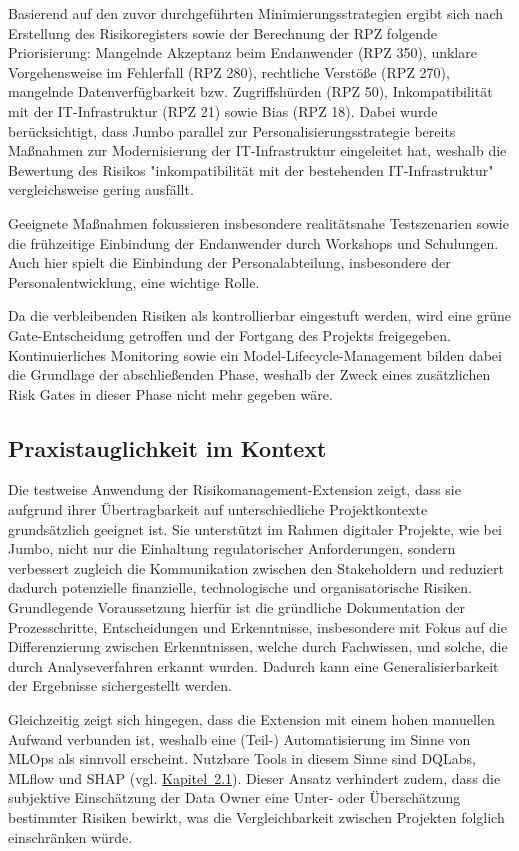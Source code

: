 Basierend auf den zuvor durchgeführten Minimierungsstrategien ergibt sich nach Erstellung des Risikoregisters sowie der Berechnung der RPZ folgende Priorisierung: 
Mangelnde Akzeptanz beim Endanwender (RPZ 350), unklare Vorgehensweise im Fehlerfall (RPZ 280), rechtliche Verstöße (RPZ 270), mangelnde Datenverfügbarkeit bzw. Zugriffshürden (RPZ 50), Inkompatibilität mit der IT-Infrastruktur (RPZ 21) sowie Bias (RPZ 18). 
Dabei wurde berücksichtigt, dass Jumbo parallel zur Personalisierungsstrategie bereits Maßnahmen zur Modernisierung der IT-Infrastruktur eingeleitet hat, weshalb die Bewertung des Risikos "inkompatibilität mit der bestehenden IT-Infrastruktur" vergleichsweise gering ausfällt.

Geeignete Maßnahmen fokussieren insbesondere realitätsnahe Testszenarien sowie die frühzeitige Einbindung der Endanwender durch Workshops und Schulungen. Auch hier spielt die Einbindung der Personalabteilung, insbesondere der Personalentwicklung, eine wichtige Rolle.

Da die verbleibenden Risiken als kontrollierbar eingestuft werden, 
wird eine grüne Gate-Entscheidung getroffen und der Fortgang des Projekts freigegeben. 
Kontinuierliches Monitoring sowie ein Model-Lifecycle-Management bilden dabei die Grundlage der abschließenden Phase, weshalb der Zweck eines zusätzlichen Risk Gates in dieser Phase nicht mehr gegeben wäre.

\subsection{Praxistauglichkeit im Kontext}
Die testweise Anwendung der Risikomanagement-Extension zeigt, dass sie aufgrund ihrer Übertragbarkeit auf unterschiedliche Projektkontexte grundsätzlich geeignet ist.
Sie unterstützt im Rahmen digitaler Projekte, wie bei Jumbo, nicht nur die Einhaltung regulatorischer Anforderungen, 
sondern verbessert zugleich die Kommunikation zwischen den Stakeholdern 
und reduziert dadurch potenzielle finanzielle, technologische und organisatorische Risiken. Grundlegende Voraussetzung hierfür ist die gründliche Dokumentation der Prozesschritte, Entscheidungen und Erkenntnisse, insbesondere mit Fokus auf die Differenzierung zwischen Erkenntnissen, welche durch Fachwissen, und solche, die durch Analyseverfahren erkannt wurden. Dadurch kann eine Generalisierbarkeit der Ergebnisse sichergestellt werden.

Gleichzeitig zeigt sich hingegen, dass die Extension mit einem hohen manuellen Aufwand verbunden ist, weshalb eine (Teil-) Automatisierung im Sinne von MLOps als sinnvoll erscheint. Nutzbare Tools in diesem Sinne sind DQLabs, MLflow und SHAP (vgl. \hyperref[sec:begriffe]{Kapitel~2.1}).
Dieser Ansatz verhindert zudem, dass die subjektive Einschätzung der Data Owner eine Unter- oder Überschätzung bestimmter Risiken bewirkt, was die Vergleichbarkeit zwischen Projekten folglich einschränken würde.

